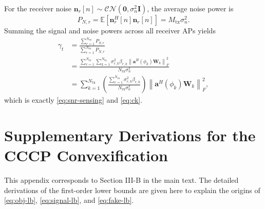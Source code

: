 \documentclass[conference,twocolumn,a4paper]{IEEEtran}
\begin{document}
For the receiver noise $\mathbf{n}_r[n]\sim\mathcal{CN}(\mathbf{0},\sigma_n^2\mathbf{I})$, the average noise power is
\begin{equation}
P_{N,r}=\mathbb{E}\!\left[\mathbf{n}_r^H[n]\mathbf{n}_r[n]\right]=M_{\mathrm{tx}}\sigma_n^2.
\label{eq:appA-pn-en}
\end{equation}
Summing the signal and noise powers across all receiver APs yields
\begin{align}
\gamma_t
&=\frac{\sum_{r=1}^{N_{\mathrm{rx}}}P_{S,r}}{\sum_{r=1}^{N_{\mathrm{rx}}}P_{N,r}} \nonumber\\
&=\frac{\sum_{r=1}^{N_{\mathrm{rx}}}\sum_{k=1}^{N_{\mathrm{tx}}}\sigma_{r,k}^2\beta_{r,k}\left\|\mathbf{a}^H(\phi_k)\mathbf{W}_k\right\|_F^2}{N_{\mathrm{rx}}\sigma_n^2} \nonumber\\
&=\sum_{k=1}^{N_{\mathrm{tx}}}\left(\frac{\sum_{r=1}^{N_{\mathrm{rx}}}\sigma_{r,k}^2\beta_{r,k}}{N_{\mathrm{rx}}\sigma_n^2}\right)\left\|\mathbf{a}^H(\phi_k)\mathbf{W}_k\right\|_F^2,
\label{eq:appA-gamma-en}
\end{align}
which is exactly \eqref{eq:snr-sensing} and \eqref{eq:ck}.

\section{Supplementary Derivations for the CCCP Convexification}
This appendix corresponds to Section III-B in the main text. The detailed derivations of the first-order lower bounds are given here to explain the origins of \eqref{eq:obj-lb}, \eqref{eq:signal-lb}, and \eqref{eq:fake-lb}.
\end{document}
